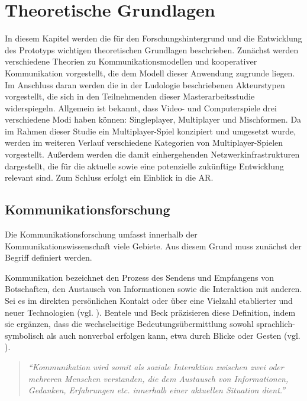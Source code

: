 \chapter{Theoretische Grundlagen}\label{sec:basics}

In diesem Kapitel werden die für den Forschungshintergrund und die Entwicklung des Prototyps wichtigen theoretischen Grundlagen beschrieben.
Zunächst werden verschiedene Theorien zu Kommunikationsmodellen und kooperativer Kommunikation vorgestellt, die dem Modell dieser Anwendung zugrunde liegen.
Im Anschluss daran werden die in der Ludologie beschriebenen Akteurstypen vorgestellt, die sich in den Teilnehmenden dieser Masterarbeitsstudie widerspiegeln.
Allgemein ist bekannt, dass Video- und Computerspiele drei verschiedene Modi haben können: Singleplayer, Multiplayer und Mischformen. Da im Rahmen dieser Studie ein Multiplayer-Spiel konzipiert und umgesetzt wurde, werden im weiteren Verlauf verschiedene Kategorien von Multiplayer-Spielen vorgestellt. Außerdem werden die damit einhergehenden Netzwerkinfrastrukturen dargestellt, die für die aktuelle sowie eine potenzielle zukünftige Entwicklung relevant sind. Zum Schluss erfolgt ein Einblick in die \ac{AR}.

\section{Kommunikationsforschung}

Die Kommunikationsforschung umfasst innerhalb der Kommunikationswissenschaft viele Gebiete. Aus diesem Grund muss zunächst der Begriff  definiert werden.

Kommunikation bezeichnet den Prozess des Sendens und Empfangens von Botschaften, den Austausch von Informationen sowie die Interaktion mit anderen. Sei es im direkten persönlichen Kontakt oder über eine Vielzahl etablierter und neuer Technologien (vgl. \citealp[S. 18]{krcmar_communication_2016}).
Bentele und Beck präzisieren diese Definition, indem sie ergänzen, dass die wechselseitige Bedeutungsübermittlung sowohl sprachlich-symbolisch als auch nonverbal erfolgen kann, etwa durch Blicke oder Gesten (vgl. \citealp[S. 20]{bentele_information_1994}).

\begin{quote}
\textit{\enquote{Kommunikation wird somit als soziale Interaktion zwischen zwei oder mehreren Menschen verstanden, die dem Austausch von Informationen, Gedanken, Erfahrungen etc. innerhalb einer aktuellen Situation dient.}} \cite[S. 19]{becker_praxishandbuch_2018}
\end{quote}

